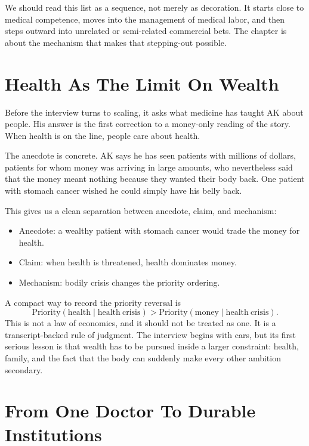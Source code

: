 We should read this list as a sequence, not merely as decoration. It starts close to medical competence, moves into the management of medical labor, and then steps outward into unrelated or semi-related commercial bets. The chapter is about the mechanism that makes that stepping-out possible.

\section{Health As The Limit On Wealth}

Before the interview turns to scaling, it asks what medicine has taught AK about people. His answer is the first correction to a money-only reading of the story. When health is on the line, people care about health.

The anecdote is concrete. AK says he has seen patients with millions of dollars, patients for whom money was arriving in large amounts, who nevertheless said that the money meant nothing because they wanted their body back. One patient with stomach cancer wished he could simply have his belly back.

This gives us a clean separation between anecdote, claim, and mechanism:
\begin{itemize}
\item Anecdote: a wealthy patient with stomach cancer would trade the money for health.
\item Claim: when health is threatened, health dominates money.
\item Mechanism: bodily crisis changes the priority ordering.
\end{itemize}

A compact way to record the priority reversal is
\begin{equation}
\mathrm{Priority}(\mathrm{health}\mid \mathrm{health\ crisis})
>
\mathrm{Priority}(\mathrm{money}\mid \mathrm{health\ crisis}).
\end{equation}
This is not a law of economics, and it should not be treated as one. It is a transcript-backed rule of judgment. The interview begins with cars, but its first serious lesson is that wealth has to be pursued inside a larger constraint: health, family, and the fact that the body can suddenly make every other ambition secondary.

\section{From One Doctor To Durable Institutions}

